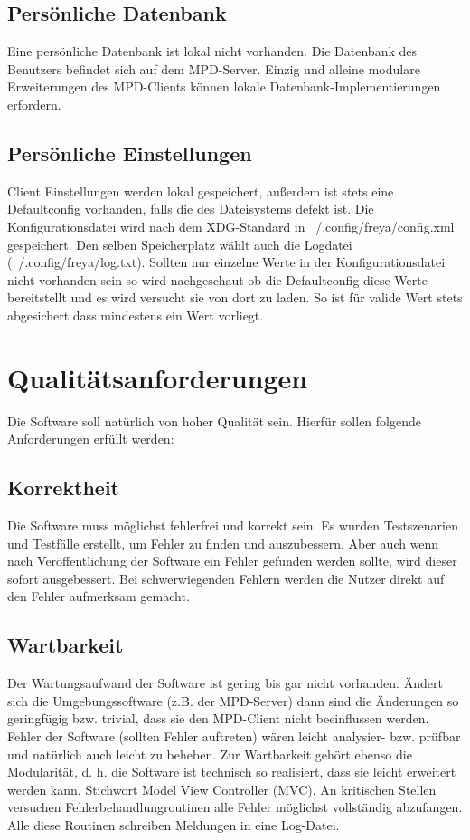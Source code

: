 \subsection{Persönliche Datenbank}
Eine persönliche Datenbank ist lokal nicht vorhanden. Die Datenbank des Benutzers befindet sich auf dem MPD-Server.
Einzig und alleine modulare Erweiterungen des MPD-Clients können lokale Datenbank-Implementierungen erfordern.
\subsection{Persönliche Einstellungen}
Client Einstellungen werden lokal gespeichert, außerdem ist stets eine Defaultconfig vorhanden, falls die des Dateisystems defekt ist.
Die Konfigurationsdatei wird nach dem XDG-Standard in ~/.config/freya/config.xml gespeichert. Den selben Speicherplatz wählt auch die Logdatei 
(~/.config/freya/log.txt). Sollten nur einzelne Werte in der Konfigurationsdatei nicht vorhanden sein so wird nachgeschaut ob die Defaultconfig
diese Werte bereitstellt und es wird versucht sie von dort zu laden. So ist für valide Wert stets abgesichert dass mindestens ein Wert vorliegt.
\section{Qualitätsanforderungen}
Die Software soll natürlich von hoher Qualität sein. Hierfür sollen folgende
Anforderungen erfüllt werden:
\subsection{Korrektheit}
Die Software muss möglichst fehlerfrei und korrekt sein. Es wurden Testszenarien und Testfälle erstellt,
um Fehler zu finden und auszubessern. Aber auch wenn nach Veröffentlichung der Software ein 
Fehler gefunden werden sollte, wird dieser sofort ausgebessert. Bei schwerwiegenden Fehlern
werden die Nutzer direkt auf den Fehler aufmerksam gemacht.
\subsection{Wartbarkeit}
Der Wartungsaufwand der Software ist gering bis gar nicht vorhanden. Ändert sich die Umgebungssoftware
(z.B. der MPD-Server) dann sind die Änderungen so geringfügig bzw. trivial, dass sie den MPD-Client 
nicht beeinflussen werden. Fehler der Software (sollten Fehler auftreten) wären leicht analysier- bzw.
prüfbar und natürlich auch leicht zu beheben. Zur Wartbarkeit gehört ebenso die Modularität, d. h.
die Software ist technisch so realisiert, dass sie leicht erweitert werden kann, Stichwort Model View
Controller (MVC). An kritischen Stellen versuchen Fehlerbehandlungroutinen alle Fehler möglichst vollständig abzufangen. 
Alle diese Routinen schreiben Meldungen in eine Log-Datei.
